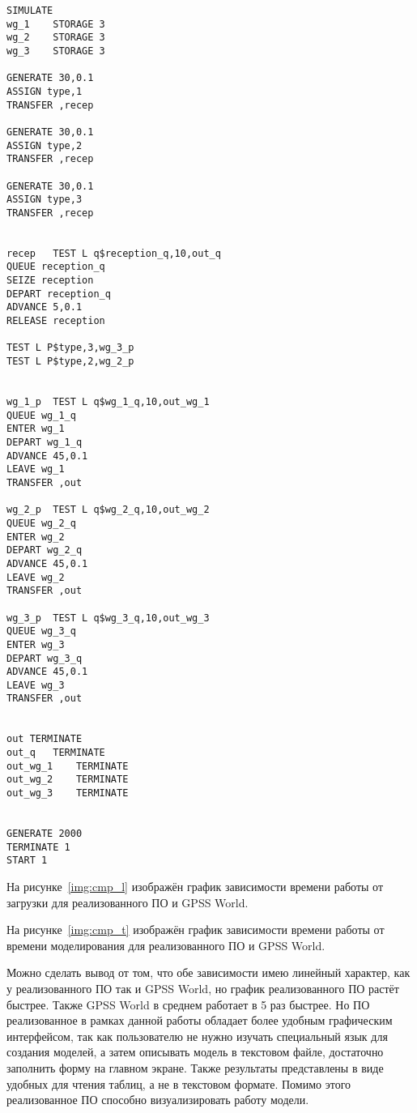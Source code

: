 \begin{center}
	\captionsetup{justification=raggedright,singlelinecheck=off}
	\begin{lstlisting}[label=lst:gpss,caption=Модель GPSS World,showstringspaces=false]
SIMULATE
wg_1	STORAGE 3
wg_2	STORAGE 3
wg_3	STORAGE 3

GENERATE 30,0.1
ASSIGN type,1
TRANSFER ,recep

GENERATE 30,0.1
ASSIGN type,2
TRANSFER ,recep

GENERATE 30,0.1
ASSIGN type,3
TRANSFER ,recep


recep	TEST L q$reception_q,10,out_q
QUEUE reception_q
SEIZE reception
DEPART reception_q
ADVANCE 5,0.1
RELEASE reception

TEST L P$type,3,wg_3_p
TEST L P$type,2,wg_2_p


wg_1_p	TEST L q$wg_1_q,10,out_wg_1
QUEUE wg_1_q
ENTER wg_1
DEPART wg_1_q
ADVANCE 45,0.1
LEAVE wg_1
TRANSFER ,out

wg_2_p	TEST L q$wg_2_q,10,out_wg_2
QUEUE wg_2_q
ENTER wg_2
DEPART wg_2_q
ADVANCE 45,0.1
LEAVE wg_2
TRANSFER ,out

wg_3_p	TEST L q$wg_3_q,10,out_wg_3
QUEUE wg_3_q
ENTER wg_3
DEPART wg_3_q
ADVANCE 45,0.1
LEAVE wg_3
TRANSFER ,out


out	TERMINATE
out_q	TERMINATE
out_wg_1	TERMINATE
out_wg_2	TERMINATE
out_wg_3	TERMINATE


GENERATE 2000
TERMINATE 1
START 1
	\end{lstlisting}
\end{center}
\FloatBarrier

На рисунке~\ref{img:cmp_l} изображён график зависимости времени работы от загрузки для реализованного ПО и GPSS World.

\FloatBarrier

На рисунке~\ref{img:cmp_t} изображён график зависимости времени работы от времени моделирования для реализованного ПО и GPSS World.

\FloatBarrier

Можно сделать вывод от том, что обе зависимости имею линейный характер, как у реализованного ПО так и GPSS World, но график реализованного ПО растёт быстрее. Также GPSS World в среднем работает в 5 раз быстрее. Но ПО реализованное в рамках данной работы обладает более удобным графическим интерфейсом, так как пользователю не нужно изучать специальный язык для создания моделей, а затем описывать модель в текстовом файле, достаточно заполнить форму на главном экране. Также результаты представлены в виде удобных для чтения таблиц, а не в текстовом формате. Помимо этого реализованное ПО способно визуализировать работу модели.

